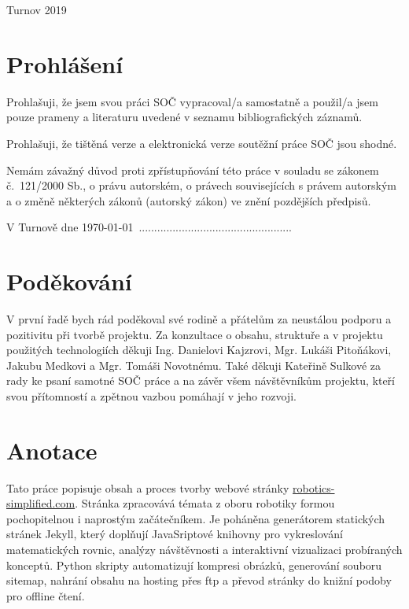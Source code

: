 \documentclass[a4paper, 12pt, twoside]{article}
\begin{document}
  \fontsize{12}{14.4} \selectfont
  Turnov 2019

  \vspace{4em}

  \cleardoublepage

  \section*{\normalfont\textbf{Prohlášení}}
  Prohlašuji, že jsem svou práci SOČ vypracoval/a samostatně a použil/a jsem pouze prameny a literaturu uvedené v seznamu bibliografických záznamů.

  Prohlašuji, že tištěná verze a elektronická verze soutěžní práce SOČ jsou shodné.

  Nemám závažný důvod proti zpřístupňování této práce v souladu se zákonem č.~121/2000 Sb., o právu autorském, o právech souvisejících s právem autorským a o změně některých zákonů (autorský zákon) ve znění pozdějších předpisů.

  \qquad

  V Turnově dne \today \, ..................................................\\%

  \cleardoublepage

  \section*{\normalfont\textbf{Poděkování}}
  V první řadě bych rád poděkoval své rodině a přátelům za neustálou podporu a pozitivitu při tvorbě projektu. Za konzultace o obsahu, struktuře a v projektu použitých technologiích děkuji Ing. Danielovi Kajzrovi, Mgr. Lukáši Pitoňákovi, Jakubu Medkovi a Mgr. Tomáši Novotnému. Také děkuji Kateřině Sulkové za rady ke psaní samotné SOČ práce a na závěr všem návštěvníkům projektu, kteří svou přítomností a zpětnou vazbou pomáhají v jeho rozvoji.

  \cleardoublepage

  \section*{\normalfont\textbf{Anotace}}
  Tato práce popisuje obsah a proces tvorby webové stránky \url{robotics-simplified.com}. Stránka zpracovává témata z oboru robotiky formou pochopitelnou i naprostým začátečníkem. Je poháněna generátorem statických stránek Jekyll, který doplňují JavaSriptové knihovny pro vykreslování matematických rovnic, analýzy návštěvnosti a interaktivní vizualizaci probíraných konceptů. Python skripty automatizují kompresi obrázků, generování souboru sitemap, nahrání obsahu na hosting přes \acrshort{ftp} a převod stránky do knižní podoby pro offline čtení.
\end{document}
